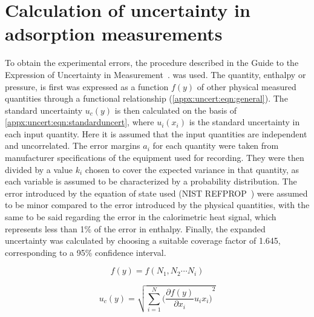 
\graphicspath{ {\thisappx/figures/} }

\chapter{Calculation of uncertainty in adsorption measurements}%
\label{appx:errors}

To obtain the experimental errors, the procedure described in 
the Guide to the Expression of Uncertainty in 
Measurement~\cite{EvaluationMeasurementData2008}.
was used. The quantity, enthalpy or pressure, is first was expressed
as a function \(f(y)\) of other physical measured quantities through a
functional relationship (\autoref{appx:uncert:eqn:general}). 
The standard uncertainty \(u_c (y)\)
is then calculated on the basis of \autoref{appx:uncert:eqn:standarduncert}, where \(u_i (x_i)\) is
the standard uncertainty in each input quantity. Here it is assumed 
that the input quantities are independent and uncorrelated. 
The error margins \(a_i\) for each quantity were taken from manufacturer 
specifications of the equipment used for recording. They were then divided
by a value \(k_i\) chosen to cover the expected variance in that quantity,
as each variable is assumed to be characterized by a probability 
distribution. The error introduced by the equation of state used 
(NIST REFPROP~\cite{lemmonNISTReferenceFluid1989}) were assumed to
be minor compared to the error 
introduced by the physical quantities, with the same to be 
said regarding the error in the calorimetric heat signal, which 
represents less than 1\% of the error in enthalpy. Finally, the expanded 
uncertainty was calculated by choosing a suitable coverage factor of
1.645, corresponding to a 95\% confidence interval.

\begin{equation}\label{appx:uncert:eqn:general}
    f(y)=f(N_1,N_2 \cdots N_i)
\end{equation}

\begin{equation}\label{appx:uncert:eqn:standarduncert}
    u_c(y) = \sqrt{ \sum_{i=1}^N {\Big( \frac{\partial f(y)}{\partial x_i} u_i x_i  \Big)}^2 }
\end{equation}


